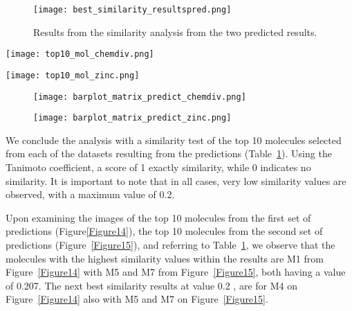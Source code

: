 \documentclass[final,times,twocolumn,article]{elsarticle}
\begin{document}
 \begin{figure}[h]
    \centering 
     \texttt{[image: best\_similarity\_resultspred.png]}	
     \caption{Results from the similarity analysis from the two predicted results.} 
     \label{Figure13}
 \end{figure}

 \begin{figure*}[h]
    \centering 
     \texttt{[image: top10\_mol\_chemdiv.png]}	
     \caption{The 10 molecules from the first predicted results with a higher activity value} 
     \label{Figure14}
 \end{figure*}

 \begin{figure*}[h]
    \centering 
     \texttt{[image: top10\_mol\_zinc.png]}	
     \caption{The 10 molecules from the second predicted results with a higher activity value} 
     \label{Figure15}
 \end{figure*}

 \begin{figure*}
    \centering
    \begin{subfigure}{1\textwidth}
        \texttt{[image: barplot\_matrix\_predict\_chemdiv.png]} 
        \caption{}
    \end{subfigure}
    \begin{subfigure}{1\textwidth}
        \texttt{[image: barplot\_matrix\_predict\_zinc.png]}
        \caption{}
    \end{subfigure}
    
    \caption{Barplot matrix analysis from predicted results among IC50. (a)Fist predict, Chemdiv (b)Second predict, Zinc }
    \label{Figure16}
\end{figure*}


 We conclude the analysis with a similarity test of the top 10 molecules selected from each of the datasets resulting from the predictions (Table~\ref{Figure13}). Using the Tanimoto coefficient, a score of 1 exactly similarity, while 0 indicates no similarity. It is important to note that in all cases, very low similarity values are observed, with a maximum value of 0.2.

 Upon examining the images of the top 10 molecules from the first set of predictions (Figure{\ref{Figure14}}), the top 10 molecules from the second set of predictions (Figure~\ref{Figure15}), and referring to Table~\ref{Figure13}, we observe that the molecules with the highest similarity values within the results are M1 from Figure~\ref{Figure14} with M5 and M7 from Figure~\ref{Figure15}, both having a value of 0.207. The next best similarity results at value 0.2 , are for M4 on Figure~\ref{Figure14} also with M5 and M7 on Figure~\ref{Figure15}. 
 
\end{document}
